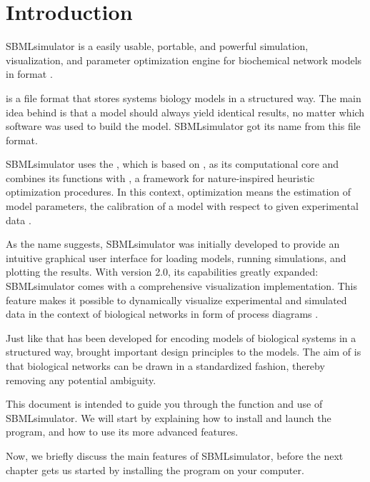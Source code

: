 
\chapter{Introduction}

SBMLsimulator \citep{Doerr2014a} is a easily usable, portable, and powerful simulation, visualization, and parameter optimization engine for biochemical network models in \SBML format \citep{M.Hucka03012003}.

\SBML is a file format that stores systems biology models in a structured way.
The main idea behind \SBML is that a model should always yield identical results, no matter which software was used to build the model.
SBMLsimulator got its name from this file format.

SBMLsimulator uses the \SBSCL \citep{Keller2013}, which is based on \JSBML \citep{Draeger2011, Rodriguez2015}, as its computational core and combines its functions with \EvA \citep{Kron10EvA2}, a \Java framework for nature-inspired heuristic optimization procedures.
In this context, optimization means the estimation of model parameters, \ie the calibration of a model with respect to given experimental data \citep{Draeger2009a}.

As the name suggests, SBMLsimulator was initially developed to provide an intuitive graphical user interface for loading \SBML models, running simulations, and plotting the results.
With version 2.0, its capabilities greatly expanded: SBMLsimulator comes with a comprehensive visualization implementation. 
This feature makes it possible to dynamically visualize experimental and simulated data in the context of biological networks in form of \SBGN process diagrams \citep{Rougny2019}.

Just like \SBML that has been developed for encoding models of biological systems in a structured way, \SBGN brought important design principles to the models.
The aim of \SBGN is that biological networks can be drawn in a standardized fashion, thereby removing any potential ambiguity.

This document is intended to guide you through the function and use of SBMLsimulator.
We will start by explaining how to install and launch the program, and how to use its more advanced features.

Now, we briefly discuss the main features of SBMLsimulator, before the next chapter gets us started by installing the program on your computer.

